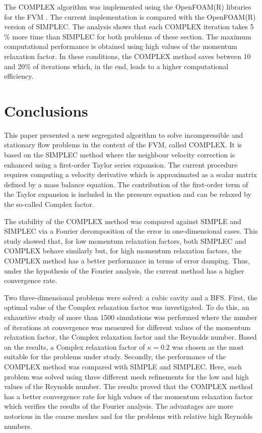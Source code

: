 \documentclass[final,3p,times,11pt,onecolumn]{myElsarticle}
\numberwithin{equation}{section}
\begin{document}
The COMPLEX algorithm was implemented using the OpenFOAM(R) libraries for the FVM \cite{ofpg}. The current implementation is compared with the OpenFOAM(R) version of SIMPLEC. The analysis shows that each COMPLEX iteration takes 5$\%$ more time than SIMPLEC for both problems of these section. The maximum computational performance is obtained using high values of the momentum relaxation factor. In these conditions, the COMPLEX method saves between 10 and 20$\%$ of iterations which, in the end, leads to a higher computational efficiency.

\section{Conclusions}
\label{sec:conclusions}
This paper presented a new segregated algorithm to solve incompressible and stationary flow problems in the context of the FVM, called COMPLEX. It is based on the SIMPLEC method where the neighbour velocity correction is enhanced using a first-order Taylor series expansion. The current procedure requires computing a velocity derivative which is approximated as a scalar matrix defined by a mass balance equation. The contribution of the first-order term of the Taylor expansion is included in the pressure equation and can be relaxed by the so-called Complex factor.

The stability of the COMPLEX method was compared against SIMPLE and SIMPLEC via a Fourier decomposition of the error in one-dimensional cases. This study showed that, for low momentum relaxation factors, both SIMPLEC and COMPLEX behave similarly but, for high momentum relaxation factors, the COMPLEX method has a better performance in terms of error damping. Thus, under the hypothesis of the Fourier analysis, the current method has a higher convergence rate.

Two three-dimensional problems  were solved: a cubic cavity and a BFS. First, the optimal value of the Complex relaxation factor was investigated. To do this, an exhaustive study of more than 1500 simulations was performed where the number of iterations at convergence was measured for different values of the momentum relaxation factor, the Complex relaxation factor and the Reynolds number. Based on the results, a Complex relaxation factor of $\kappa = 0.2$ was chosen as the most suitable for the problems under study. Secondly, the performance of the COMPLEX method was compared with SIMPLE and SIMPLEC. Here, each problem was solved using three different mesh refinements for the low and high values of the Reynolds number. The results proved that the COMPLEX method has a better convergence rate for high values of the momentum relaxation factor which verifies the results of the Fourier analysis. The advantages are more notorious in the coarse meshes and for the problems with relative high Reynolds numbers. %
\end{document}

